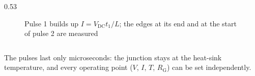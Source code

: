 \begin{frame}
\begin{columns}[T]
\begin{column}{0.53\textwidth}
\begin{figure}
				\caption{Pulse 1 builds up $I=V_\mathrm{DC}t_1/L$; the edges at its end and at the start of pulse 2 are measured}
			\end{figure}
		\end{column}
	\end{columns}
	\small
	The pulses last only microseconds: the junction stays at the heat-sink temperature, and every operating point ($V$, $I$, $T$, $R_\mathrm{G}$) can be set independently.
\end{frame}

